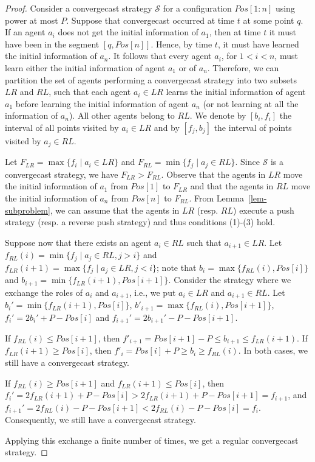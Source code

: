 \documentclass{article}
\newcommand{\cA}{\ensuremath{\mathcal{S}\xspace}}
\newcommand\convergecast{convergecast\xspace}
\begin{document}
\begin{proof}
Consider a {\convergecast} strategy $\cA$ for a configuration
$Pos[1:n]$ using power at most $P$. Suppose that convergecast occurred at time $t$ at some point $q$.
If an agent $a_i$ does not get the initial information of $a_1$, then at time $t$ it must have been in the segment 
$[q,Pos[n]]$. Hence, by time $t$, it must have learned the initial information of $a_n$. It follows that every
agent $a_i$, for $1 < i < n$, must learn either the initial
information of agent $a_1$ or of $a_n$. Therefore, we can partition the
set of agents performing a {\convergecast} strategy into two subsets
$LR$ and $RL$, such that each agent $a_i \in LR$ learns the initial
information of agent $a_1$ before learning the initial information of
agent $a_n$ (or not learning at all the information of $a_n$). All
other agents belong to $RL$. We denote by $[b_i,f_i]$ the interval of
all points visited by $a_i \in LR$ and by $[f_j,b_j]$ the interval of points
visited by $a_j \in RL$.

Let $F_{LR} = \max \{f_i \mid a_i \in LR\}$ and $F_{RL} = \min \{f_j
\mid a_j \in RL\}$. Since $\cA$ is a convergecast strategy, we have $F_{LR} >
F_{RL}$. Observe that the agents in $LR$ move the initial information of $a_1$ from
$Pos[1]$ to $F_{LR}$ and that the agents in $RL$ move the initial information of $a_n$
from $Pos[n]$ to $F_{RL}$. From Lemma~\ref{lem-subproblem}, we can
assume that the agents in $LR$ (resp. $RL$) execute a push strategy (resp. a reverse push strategy)
and thus conditions (1)-(3) hold.


Suppose now that there exists an agent $a_i \in RL$ such that $a_{i+1}
\in LR$.  Let $f_{RL}(i) = \min \{f_j \mid a_j \in RL, j>i\}$ and
$f_{LR}(i+1)=\max \{f_j \mid a_j \in LR, j<i\}$; note that $b_i = \max
\{f_{RL}(i), Pos[i]\}$ and $b_{i+1} = \min \{f_{LR}(i+1),
Pos[i+1]\}$. Consider the strategy where we exchange the roles of
$a_i$ and $a_{i+1}$, i.e., we put $a_i \in LR$ and $a_{i+1} \in
RL$. Let $b_i' = \min\{f_{LR}(i+1),Pos[i]\}$, $b'_{i+1} =
\max\{f_{RL}(i),Pos[i+1]\}$, $f_i' = 2b_i'+P-Pos[i]$ and $f_{i+1}' =
2b_{i+1}'-P-Pos[i+1]$.

If $f_{RL}(i) \leq Pos[i+1]$, then $f'_{i+1} = Pos[{i+1}]-P \leq
b_{i+1} \leq f_{LR}(i+1)$. If $f_{LR}(i+1) \geq Pos[i]$, then $f'_{i}
= Pos[i]+P \geq b_{i} \geq f_{RL}(i)$. In both cases, we still have a
{\convergecast} strategy.

If $f_{RL}(i) \geq Pos[i+1]$ and $f_{LR}(i+1) \leq Pos[i]$, then $f_i'
= 2 f_{LR}(i+1) + P -Pos[i] > 2 f_{LR}(i+1) + P -Pos[i+1] = f_{i+1}$,
and $f_{i+1}' = 2 f_{RL}(i) - P -Pos[i+1] < 2 f_{RL}(i) - P -Pos[i] =
f_{i}$. Consequently, we still have a {\convergecast} strategy.

Applying this exchange a finite number of times, we get a regular convergecast
strategy. 
\end{proof}
\end{document}
